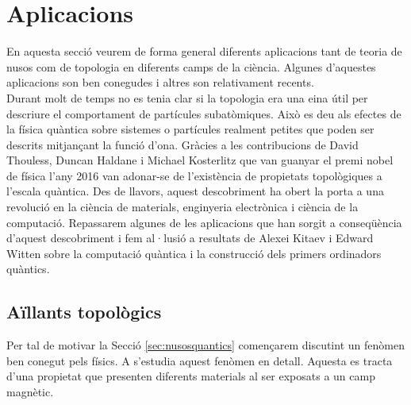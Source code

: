 
\section{Aplicacions}\label{sec:Aplicacions}

En aquesta secció veurem de forma general diferents aplicacions tant de teoria de nusos com de topologia en diferents camps de la ciència. Algunes d'aquestes aplicacions son ben conegudes i altres son relativament recents.\\

Durant molt de temps no es tenia clar si la topologia era una eina útil per descriure el comportament de partícules subatòmiques. Això es deu als efectes de la física quàntica sobre sistemes o partícules realment petites que poden ser descrits mitjançant la funció d'ona. Gràcies a les contribucions de David Thouless, Duncan Haldane i Michael Kosterlitz que van guanyar el premi nobel de física l'any 2016 van adonar-se de l'existència de propietats topològiques a l'escala quàntica. Des de llavors, aquest descobriment ha obert la porta a una revolució en la ciència de materials, enginyeria electrònica i ciència de la computació. Repassarem algunes de les aplicacions que han sorgit a conseqüència d'aquest descobriment i fem al·lusió a resultats de Alexei Kitaev i Edward Witten sobre la computació quàntica i la construcció dels primers ordinadors quàntics.

\subsection{Aïllants topològics}\label{sec:aillanttopologic}
 Per tal de motivar la Secció \ref{sec:nusosquantics} començarem discutint un fenòmen ben conegut pels físics. A \cite{topologicalinsulators} s'estudia aquest fenòmen en detall. Aquesta es tracta d'una propietat que presenten diferents materials al ser exposats a un camp magnètic.\\
 
